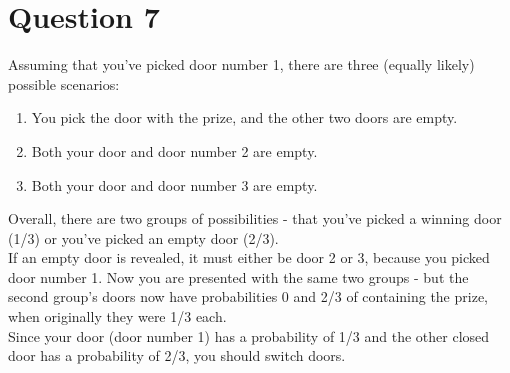 \documentclass{article}
\begin{document}
\section{Question 7}

Assuming that you've picked door number 1, there are three (equally likely) possible scenarios:

\begin{enumerate}
\item You pick the door with the prize, and the other two doors are empty.
\item Both your door and door number 2 are empty.
\item Both your door and door number 3 are empty.
\end{enumerate}

Overall, there are two groups of possibilities - that you've picked a winning door (1/3) or you've picked an empty door (2/3).\\

If an empty door is revealed, it must either be door 2 or 3, because you picked door number 1. Now you are presented with the same two groups - but the second group's doors now have probabilities 0 and 2/3 of containing the prize, when originally they were 1/3 each.\\

Since your door (door number 1) has a probability of 1/3 and the other closed door has a probability of 2/3, you should switch doors.
\end{document}

